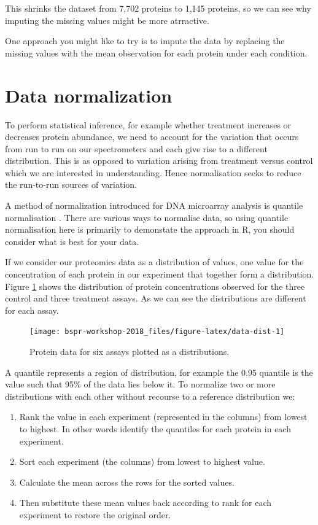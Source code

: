 \documentclass[12pt,]{book}
\providecommand{\tightlist}{%
  \setlength{\itemsep}{0pt}\setlength{\parskip}{0pt}}
\theoremstyle{definition}
\theoremstyle{definition}
\theoremstyle{definition}
\theoremstyle{remark}
\begin{document}
This shrinks the dataset from 7,702 proteins to 1,145 proteins, so we
can see why imputing the missing values might be more atrractive.

One approach you might like to try is to impute the data by replacing
the missing values with the mean observation for each protein under each
condition.

\section{Data normalization}\label{normalisation}

To perform statistical inference, for example whether treatment
increases or decreases protein abundance, we need to account for the
variation that occurs from run to run on our spectrometers and each give
rise to a different distribution. This is as opposed to variation
arising from treatment versus control which we are interested in
understanding. Hence normalisation seeks to reduce the run-to-run
sources of variation.

A method of normalization introduced for DNA microarray analysis is
quantile normalisation \citep{bolstad2003}. There are various ways to
normalise data, so using quantile normalisation here is primarily to
demonstate the approach in R, you should consider what is best for your
data.

If we consider our proteomics data as a distribution of values, one
value for the concentration of each protein in our experiment that
together form a distribution. Figure \ref{fig:data-dist} shows the
distribution of protein concentrations observed for the three control
and three treatment assays. As we can see the distributions are
different for each assay.



\begin{figure}

{\centering \texttt{[image: bspr-workshop-2018\_files/figure-latex/data-dist-1]} 

}

\caption{Protein data for six assays plotted as a distributions.}\label{fig:data-dist}
\end{figure}

A quantile represents a region of distribution, for example the 0.95
quantile is the value such that 95\% of the data lies below it. To
normalize two or more distributions with each other without recourse to
a reference distribution we:

\begin{enumerate}
\def\labelenumi{(\roman{enumi})}
\tightlist
\item
  Rank the value in each experiment (represented in the columns) from
  lowest to highest. In other words identify the quantiles for each
  protein in each experiment.
\item
  Sort each experiment (the columns) from lowest to highest value.
\item
  Calculate the mean across the rows for the sorted values.
\item
  Then substitute these mean values back according to rank for each
  experiment to restore the original order.
\end{enumerate}
\end{document}
